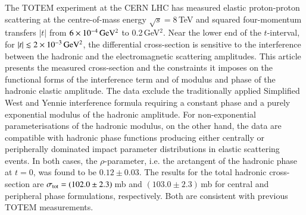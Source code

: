 The TOTEM experiment at the CERN LHC has measured elastic proton-proton 
scattering at the centre-of-mass energy 
$\sqrt{s}=8\,$TeV and squared four-momentum transfers $|t|$ from $6\times10^{-4}\,\rm GeV^{2}$ to 0.2\,GeV$^{2}$.
Near the lower end of the $t$-interval, for
$|t| \lesssim 2\times10^{-3}\,\rm GeV^{2}$, the differential cross-section is 
sensitive to the 
interference between the hadronic and the electromagnetic scattering amplitudes.
This article presents the measured cross-section and the constraints it 
imposes on the functional forms of the interference term and of modulus and
phase of the hadronic elastic amplitude. The data exclude the traditionally 
applied Simplified West and Yennie interference formula requiring a constant 
phase and a purely exponential modulus of the hadronic amplitude. 
For non-exponential parameterisations of the hadronic 
modulus, on the other hand, the data are compatible with hadronic phase 
functions producing either centrally or peripherally dominated impact 
parameter distributions in elastic scattering events. In both cases, 
the $\rho$-parameter, i.e. the arctangent of the hadronic phase at $t = 0$,
was found to be $0.12 \pm 0.03$. The results for the total hadronic 
cross-section are $\sigma_{\rm tot} = (102.0 \pm 2.3)$\,mb and 
$(103.0 \pm 2.3)$\,mb for central and peripheral phase formulations, 
respectively. Both are consistent with previous TOTEM measurements.

